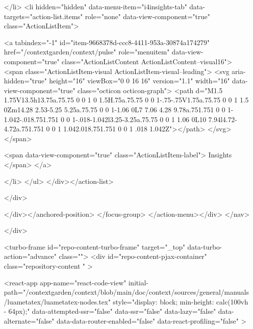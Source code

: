 </li>
        <li hidden="hidden" data-menu-item="i4insights-tab" data-targets="action-list.items" role="none" data-view-component="true" class="ActionListItem">
    
    
    <a tabindex="-1" id="item-9668378d-ccc8-4411-953a-30874a174279" href="/contextgarden/context/pulse" role="menuitem" data-view-component="true" class="ActionListContent ActionListContent--visual16">
        <span class="ActionListItem-visual ActionListItem-visual--leading">
          <svg aria-hidden="true" height="16" viewBox="0 0 16 16" version="1.1" width="16" data-view-component="true" class="octicon octicon-graph">
    <path d="M1.5 1.75V13.5h13.75a.75.75 0 0 1 0 1.5H.75a.75.75 0 0 1-.75-.75V1.75a.75.75 0 0 1 1.5 0Zm14.28 2.53-5.25 5.25a.75.75 0 0 1-1.06 0L7 7.06 4.28 9.78a.751.751 0 0 1-1.042-.018.751.751 0 0 1-.018-1.042l3.25-3.25a.75.75 0 0 1 1.06 0L10 7.94l4.72-4.72a.751.751 0 0 1 1.042.018.751.751 0 0 1 .018 1.042Z"></path>
</svg>
        </span>
      
        <span data-view-component="true" class="ActionListItem-label">
          Insights
</span>      
</a>
  
</li>
</ul>    
</div></action-list>


</div>
      
</div></anchored-position>  </focus-group>
</action-menu></div>
</nav>

  </div>

  



<turbo-frame id="repo-content-turbo-frame" target="_top" data-turbo-action="advance" class="">
    <div id="repo-content-pjax-container" class="repository-content " >
    



    
      
    








<react-app
  app-name="react-code-view"
  initial-path="/contextgarden/context/blob/main/doc/context/sources/general/manuals/luametatex/luametatex-nodes.tex"
    style="display: block; min-height: calc(100vh - 64px);"
  data-attempted-ssr="false"
  data-ssr="false"
  data-lazy="false"
  data-alternate="false"
  data-data-router-enabled="false"
  data-react-profiling="false"
>
  
